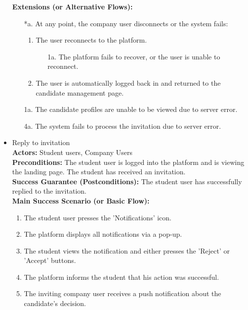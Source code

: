 \begin{itemize}[label={[\textbf{UC}]}, align=left, leftmargin=*]
    \textbf{Extensions (or Alternative Flows):} 
    \begin{enumerate}[label=\arabic*.]
        \item[*a.] At any point, the company user disconnects or the system fails:
            \begin{enumerate}[label=\arabic*.]
                \item The user reconnects to the platform.
                    \begin{enumerate}[label=\alph*.]
                        \item[1a.] The platform fails to recover, or the user is unable to reconnect.
                    \end{enumerate}
                 \item The user is automatically logged back in and returned to the candidate management page.
            \end{enumerate}
        \item[1a.] The candidate profiles are unable to be viewed due to server error. 
        \item[4a.] The system fails to process the invitation due to server error.
        \end{enumerate}


    \item {} Reply to invitation \\
    \textbf{Actors:} Student users, Company Users\\
     \textbf{Preconditions:} The student user is logged into the platform and is viewing the landing page. The student has received an invitation.\\
     \textbf{Success Guarantee (Postconditions):} The student user has successfully replied to the invitation. \\
     \textbf{Main Success Scenario (or Basic Flow):} 
     \begin{enumerate}[label=\arabic*.] 
        \item The student user presses the 'Notifications' icon.
        \item The platform displays all notifications via a pop-up.
        \item The student views the notification and either presses the 'Reject' or 'Accept' buttons.
        \item The platform informs the student that his action was successful.
        \item The inviting company user receives a push notification about the candidate's decision.
     \end{enumerate} \\


\end{itemize}
